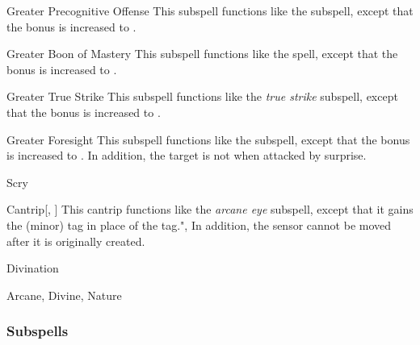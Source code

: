 \begin{ability}[\nth{5}]{Greater Precognitive Offense}
This subspell functions like the  subspell, except that the bonus is increased to .
\end{ability}
\vspace{0.25em}


\begin{ability}[\nth{6}]{Greater Boon of Mastery}
This subspell functions like the  spell, except that the bonus is increased to .
\end{ability}
\vspace{0.25em}


\begin{ability}[\nth{6}]{Greater True Strike}
This subspell functions like the \textit{true strike} subspell, except that the bonus is increased to .
\end{ability}
\vspace{0.25em}


\begin{ability}[\nth{7}]{Greater Foresight}
This subspell functions like the  subspell, except that the bonus is increased to .
In addition, the target is not  when attacked by surprise.
\end{ability}
\vspace{0.25em}

\newpage
\begin{spellsection}{Scry}

\begin{spellheader}
\end{spellheader}


\begin{ability}{Cantrip}[, ]
This cantrip functions like the \textit{arcane eye} subspell, except that it gains the  (minor) tag in place of the  tag.",
In addition, the sensor cannot be moved after it is originally created.
\end{ability}




 Divination

 Arcane, Divine, Nature
\end{spellsection}


\subsubsection{Subspells}


